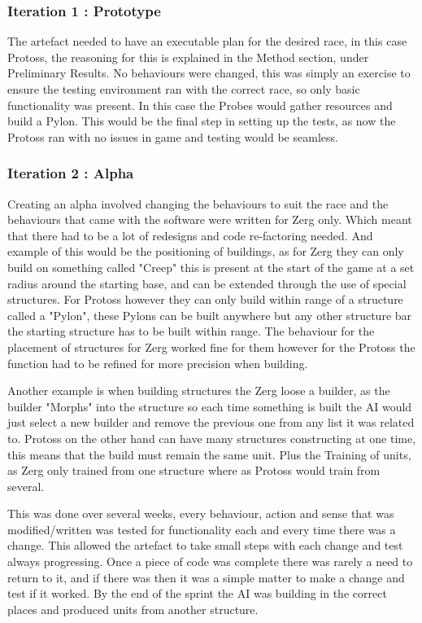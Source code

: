 \documentclass[journal]{IEEEtran}
\begin{document}
\subsubsection{Iteration 1 : Prototype}
The artefact needed to have an executable plan for the desired race, in this case Protoss, the reasoning for this is explained in the Method section, under Preliminary Results. No behaviours were changed, this was simply an exercise to ensure the testing environment ran with the correct race, so only basic functionality was present. In this case the Probes would gather resources and build a Pylon. This would be the final step in setting up the tests, as now the Protoss ran with no issues in game and testing would be seamless.
\newline

\subsubsection{Iteration 2 : Alpha}
Creating an alpha involved changing the behaviours to suit the race and the behaviours that came with the software were written for Zerg only. Which meant that there had to be a lot of redesigns and code re-factoring needed. And example of this would be the positioning of buildings, as for Zerg they can only build on something called "Creep" this is present at the start of the game at a set radius around the starting base, and can be extended through the use of special structures. For Protoss however they can only build within range of a structure called a "Pylon", these Pylons can be built anywhere but any other structure bar the starting structure has to be built within range. The behaviour for the placement of structures for Zerg worked fine for them however for the Protoss the function had to be refined for more precision when building. 

Another example is when building structures the Zerg loose a builder, as the builder "Morphs" into the structure so each time something is built the AI would just select a new builder and remove the previous one from any list it was related to. Protoss on the other hand can have many structures constructing at one time, this means that the build must remain the same unit. Plus the Training of units, as Zerg only trained from one structure where as Protoss would train from several.

This was done over several weeks, every behaviour, action and sense that was modified/written was tested for functionality each and every time there was a change. This allowed the artefact to take small steps with each change and test always progressing. Once a piece of code was complete there was rarely a need to return to it, and if there was then it was a simple matter to make a change and test if it worked. By the end of the sprint the AI was building in the correct places and produced units from another structure.
\newline
\end{document}
